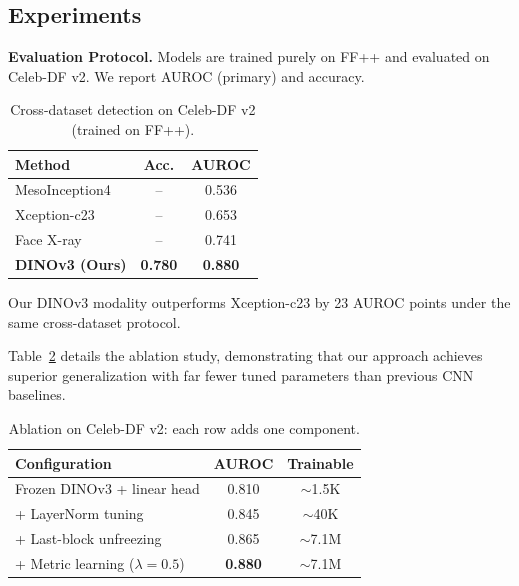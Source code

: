 \documentclass[conference]{IEEEtran}
\begin{document}
\subsection{Experiments}

\textbf{Evaluation Protocol.} Models are trained purely on FF++ and evaluated on Celeb-DF v2. We report AUROC (primary) and accuracy.

\begin{table}[!t]
\centering
\caption{Cross-dataset detection on Celeb-DF v2 (trained on FF++).}
\label{tab:results}
\begin{tabular}{lcc}
\toprule
\textbf{Method} & \textbf{Acc.} & \textbf{AUROC} \\
\midrule
MesoInception4~\cite{afchar2018mesonet}      & --   & 0.536 \\
Xception-c23~\cite{rossler2019faceforensics} & --   & 0.653 \\
Face X-ray~\cite{li2020facexray}             & --   & 0.741 \\
\textbf{DINOv3 (Ours)}  & \textbf{0.780} & \textbf{0.880} \\
\bottomrule
\end{tabular}
\end{table}

Our DINOv3 modality outperforms Xception-c23 by 23 AUROC points under the same cross-dataset protocol.

Table~\ref{tab:ablation} details the ablation study, demonstrating that our approach achieves superior generalization with far fewer tuned parameters than previous CNN baselines.

\begin{table}[!t]
\centering
\caption{Ablation on Celeb-DF v2: each row adds one component.}
\label{tab:ablation}
\begin{tabular}{lcc}
\toprule
\textbf{Configuration} & \textbf{AUROC} & \textbf{Trainable} \\
\midrule
Frozen DINOv3 + linear head         & 0.810 & ${\sim}$1.5K \\
\quad + LayerNorm tuning            & 0.845 & ${\sim}$40K  \\
\quad + Last-block unfreezing       & 0.865 & ${\sim}$7.1M \\
\quad + Metric learning ($\lambda\!=\!0.5$) & \textbf{0.880} & ${\sim}$7.1M \\
\bottomrule
\end{tabular}
\end{table}

\FloatBarrier
\end{document}
